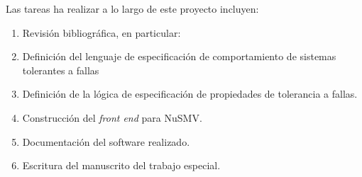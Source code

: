 \documentclass[12pt]{article}
\newcommand{\falluto}{\textsc{Falluto}}
\begin{document}
Las tareas ha realizar a lo largo de este proyecto incluyen:
%
\begin{enumerate}
\item%
  Revisi\'on bibliogr\'afica, en particular:
\item%
  Definici\'on del lenguaje de especificaci\'on de comportamiento de
  sistemas tolerantes a fallas
\item%
  Definici\'on de la l\'ogica de especificaci\'on de propiedades de
  tolerancia a fallas.
\item%
  Construcci\'on del \emph{front end} para NuSMV.
\item%
  Documentaci\'on del software realizado.
\item%
  Escritura del manuscrito del trabajo especial.
\end{enumerate}





\end{document}
